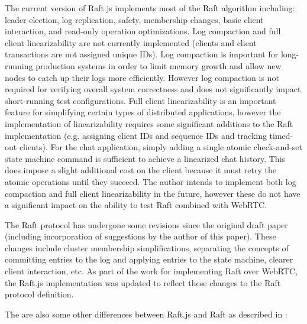 \documentclass[9pt]{extarticle}
\begin{document}
\begin{multicols}{2}
The current version of Raft.js implements most of the Raft algorithm
including: leader election, log replication, safety, membership
changes, basic client interaction, and read-only operation
optimizations. %
Log compaction and full client linearizability are not currently
implemented (clients and client transactions are not assigned unique
IDs). Log compaction is important for long-running production systems
in order to limit memory growth and allow new nodes to catch up their
logs more efficiently. However log compaction is not required for
verifying overall system correctness and does not significantly impact
short-running test configurations. Full client linearizability is
an important feature for simplifying certain types of distributed
applications, however the implementation of linearizability requires
some significant additions to the Raft implementation (e.g. assigning
client IDs and sequence IDs and tracking timed-out clients). For the
chat application, simply adding a single atomic check-and-set state
machine command is sufficient to achieve a linearized chat history.
This does impose a slight additional cost on the client because it
must retry the atomic operations until they succeed. The author
intends to implement both log compaction and full client
linearizability in the future, however these do not have a significant
impact on the ability to test Raft combined with WebRTC.

The Raft protocol has undergone some revisions since the original
draft paper \cite{raft_paper:ongaro14} (including incorporation of
suggestions by the author of this paper). These changes include
cluster membership simplifications, separating the concepts of
committing entries to the log and applying entries to the state
machine, clearer client interaction, etc. As part of the work for
implementing Raft over WebRTC, the Raft.js implementation was updated
to reflect these changes to the Raft protocol definition.

The are also some other differences between Raft.js and Raft as
described in \cite[Consensus:~Diego]{raft_thesis:ongaro14}:


\end{multicols}
\end{document}
